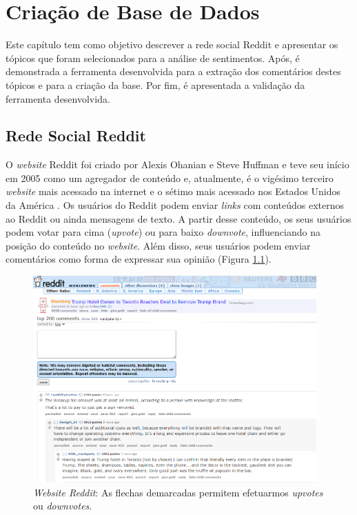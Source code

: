 \chapter{Criação de Base de Dados}
\label{cap:banco}
Este capítulo tem como objetivo descrever a rede social Reddit e apresentar os
tópicos que foram selecionados para a análise de sentimentos. Após, é
demonstrada a ferramenta desenvolvida para a extração dos comentários destes tópicos e para a criação da base. Por fim, é
apresentada a validação da ferramenta desenvolvida.
\section{Rede Social Reddit}
\label{cap:Reddit}

O \textit{website} Reddit foi criado por Alexis Ohanian e Steve Huffman e teve
seu início em 2005 como um agregador de conteúdo e, atualmente, é o vigésimo terceiro \textit{website} mais acessado na
internet e o sétimo mais acessado nos Estados Unidos da América \cite{alexa}.
Os usuários do Reddit podem enviar \textit{links} com conteúdos externos
ao Reddit ou ainda mensagens de texto. A partir desse conteúdo, os seus
usuários podem votar para cima (\textit{upvote}) ou para baixo \textit{downvote},
influenciando na posição do conteúdo no \textit{website}. Além disso, seus
usuários podem enviar comentários como forma de expressar sua opinião (Figura \ref{fig:reddit}).


\begin{figure}[!htbp]
\centering
\includegraphics[height=300px]{imagens/reddit.png}
\caption{\textit{Website Reddit}:  As flechas demarcadas permitem efetuarmos
\textit{upvotes} ou \textit{downvotes}.}
\label{fig:reddit}
\end{figure}

